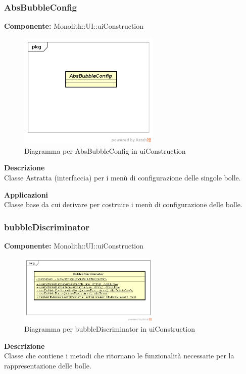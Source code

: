 \clearpage

\subsubsection{AbsBubbleConfig}
\textbf{Componente:}  Monolith::UI::uiConstruction\\
   \FloatBarrier
   \begin{figure}[ht]
   \centering
   \includegraphics[width=0.6\textwidth]{img/single-AbsBubbleConfig}
   \caption{{Diagramma per AbsBubbleConfig in uiConstruction}}
\end{figure}
\FloatBarrier
\textbf{Descrizione}\\
Classe Astratta (interfaccia) per i menù di configurazione delle singole bolle. 


\textbf{Applicazioni}\\
Classe base da cui derivare per costruire i menù di configurazione delle bolle. 


\clearpage

\subsubsection{bubbleDiscriminator}
\textbf{Componente:}  Monolith::UI::uiConstruction\\
   \FloatBarrier
   \begin{figure}[ht]
   \centering
   \includegraphics[width=0.6\textwidth]{img/single-bubbleDiscriminator}
   \caption{{Diagramma per bubbleDiscriminator in uiConstruction}}
\end{figure}
\FloatBarrier
\textbf{Descrizione}\\
Classe che contiene i metodi che ritornano le funzionalità necessarie per la rappresentazione delle bolle.

